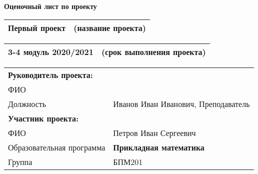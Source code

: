 \documentclass[10pt]{article}
\begin{document}
\sloppy	

\thispagestyle{empty}

\begin{center}
	{\Large \bf Оценочный лист по проекту}
\end{center}



\begin{table*}[h!]
	\centering
	\begin{tabular}{p{}<{\centering}b{}<{\raggedleft}}
		\noalign{\smallskip}
	 	Первый проект & (название проекта)\\
	\hline
	\end{tabular}
\end{table*}
\vspace{-0.5cm}
\begin{table*}[h!]
	\centering
	\begin{tabular}{p{}<{\centering}b{}<{\raggedleft}}
		\noalign{\smallskip}
		3-4 модуль 2020/2021& (срок выполнения проекта)\\
		\hline
	\end{tabular}
\end{table*}
\vspace{-0.5cm}

\begin{table*}[h!]
	\centering
	\begin{tabular}{|p{}<{\raggedright}|b{}|}
		\noalign{\smallskip}
		\hline
		{\bf Руководитель проекта:} & \\ 
		ФИО & \\
		Должность  & Иванов Иван Иванович, Преподаватель \multirow{3}{*}{}\\
		\hline
		
		{\bf Участник проекта\footnotemark : } & \\ 
		
		\hline
		ФИО & Петров Иван Сергеевич \\
		\hline
		Образовательная программа  & {\bf Прикладная математика}\\
		\hline
		Группа & БПМ201\\
		\hline	
	\end{tabular}
\end{table*}
\end{document}
